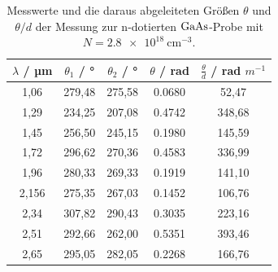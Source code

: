 \begin{table}[h]
  \centering
  \caption{Messwerte und die daraus abgeleiteten Größen $\theta$ und $\theta/d$ der Messung zur n-dotierten $\ce{GaAs}$-Probe mit $N=\SI{2,8e18}{\centi\meter^{-3}}$.}
  \label{tab:probe2}
  \begin{tabular}{S[table-format=1.1] S S S S}
    {$\lambda$ / µm} & {$\theta_1$ / °} & {$\theta_2$ / °} & {$\theta$ / rad} & {$\frac{\theta}{d}$ / rad $m^{-1}$}\\
    ,06 &  279,48 &  275,58 & 0.0680 & 52,47\\
    1,29 &  234,25 &  207,08 & 0.4742 & 348,68\\
    1,45 &  256,50 &  245,15 & 0.1980 & 145,59\\
    1,72 &  296,62 &  270,36 & 0.4583 & 336,99\\
    1,96 &  280,33 &  269,33 & 0.1919 & 141,10\\
    2,156 & 275,35 &  267,03 & 0.1452 & 106,76\\
    2,34 & 307,82 &  290,43 & 0.3035 & 223,16\\
    2,51 & 292,66 &  262,00 & 0.5351 & 393,46\\
    2,65 & 295,05 &  282,05 & 0.2268 & 166,76\\
  \end{tabular}
\end{table}

